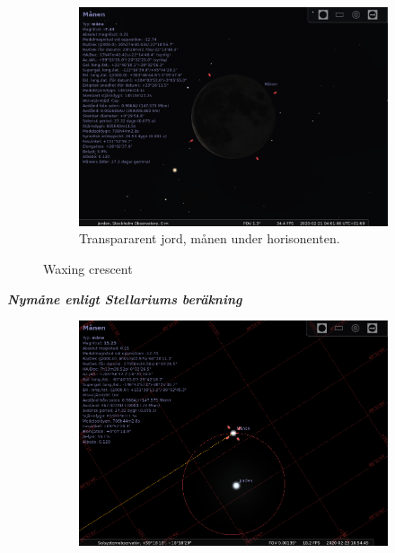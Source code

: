 \documentclass[./exercises.tex]{subfiles}
\begin{document}
\begin{itemize}
\begin{figure}[H]
     \hfill
     \begin{subfigure}[b]{0.45\textwidth}
         \centering
         \includegraphics[width=\textwidth]{Stellarium1/WXCresc/stellarium-003.png}
         \caption{Transpararent jord, månen under horisonenten. }
         \label{fig:three sin x}
     \end{subfigure}
     \hfill
        \caption{Waxing crescent }
        \label{fig:perod graphs}
\end{figure}
\newpage
\textit{\textbf{Nymåne enligt Stellariums beräkning}}
\begin{figure}[H]
     \centering
     \begin{subfigure}[b]{0.45\textwidth}
         \centering
         \includegraphics[width=\textwidth]{Stellarium1/NewMoon/stellarium-000.png}

\end{subfigure}
\end{figure}
\end{itemize}
\end{document}
